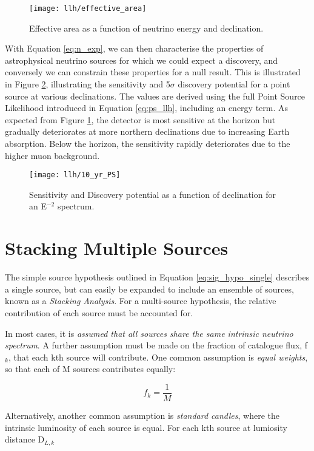 \begin{figure}[!ht]
	\centering \texttt{[image: llh/effective\_area]}
	\caption{Effective area as a function of neutrino energy and declination.}
	\label{fig:effective_area}
\end{figure}

With Equation \ref{eq:n_exp}, we can then characterise the properties of astrophysical neutrino sources for which we could expect a discovery, and conversely we can constrain these properties for a null result. This is illustrated in Figure \ref{fig:10yr_ps}, illustrating the sensitivity and 5$\sigma$ discovery potential for a point source at various declinations. The values are derived using the full Point Source Likelihood introduced in Equation \ref{eq:ps_llh}, including an energy term. As expected from Figure \ref{fig:effective_area}, the detector is most sensitive at the horizon but gradually deteriorates at more northern declinations due to increasing Earth absorption. Below the horizon, the sensitivity rapidly deteriorates due to the higher muon background.

\begin{figure}[!ht]
	\centering \texttt{[image: llh/10\_yr\_PS]}
	\caption{Sensitivity and Discovery potential as a function of declination for an E$^{-2}$ spectrum.}
	\label{fig:10yr_ps}
\end{figure}

\section{Stacking Multiple Sources}

The simple source hypothesis outlined in Equation \ref{eq:sig_hypo_single} describes a single source, but can easily be expanded to include an ensemble of sources, known as a \emph{Stacking Analysis}. For a multi-source hypothesis, the relative contribution of each source must be accounted for.

In most cases, it is \emph{assumed that all sources share the same intrinsic neutrino spectrum}. A further assumption must be made on the fraction of catalogue flux, f$_{k}$, that each kth source will contribute. One common assumption is \emph{equal weights}, so that each of M sources contributes equally:

\begin{equation}
f_{k} = \frac{1}{M}
\label{eq:equal_weighting}
\end{equation}

Alternatively, another common assumption is \emph{standard candles}, where the intrinsic luminosity of each source is equal. For each kth source at lumiosity distance D$_{L,k}$

